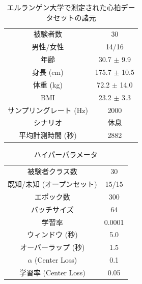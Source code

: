 \begin{table}[H]
\caption{エルランゲン大学で測定された心拍データセットの諸元}
\centering
\begin{tabular}{cc}
\hline
被験者数 & 30 \\
男性/女性 & 14/16 \\
年齢 & 30.7 $\pm$ 9.9 \\
身長 (cm) & 175.7 $\pm$ 10.5 \\
体重 (kg) & 72.2 $\pm$ 14.0 \\
BMI & 23.2 $\pm$ 3.3 \\
サンプリングレート (Hz) & 2000 \\
シナリオ & 休息 \\
平均計測時間 (秒) & 2882 \\
\hline
\end{tabular}
\label{table:30-dataset}
\end{table}

\begin{table}[H]
\caption{ハイパーパラメータ}
\centering
\begin{tabular}{cc}
\hline
被験者クラス数 & 30 \\
既知/未知 (オープンセット) & 15/15 \\
エポック数 & 300 \\
バッチサイズ & 64 \\
学習率 & 0.0001 \\
ウィンドウ (秒) & 5.0 \\
オーバーラップ (秒) & 1.5 \\
$\alpha$ (Center Loss) & 0.1 \\
学習率 (Center Loss) & 0.05 \\
\hline
\end{tabular}
\label{table:30-parameter}
\end{table}

